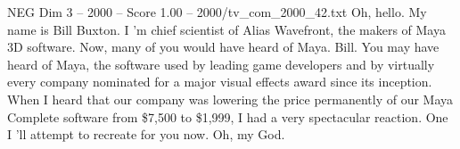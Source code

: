 \begin{textsample}{NEG Dim 3 – 2000 – Score 1.00 – 2000/tv\_com\_2000\_42.txt}  \label{ex:f3_neg_006}
Oh, hello.
My name is Bill Buxton.
I 'm chief scientist of Alias Wavefront, the makers of Maya 3D software.
Now, many of you would have heard of Maya.
Bill.
You may have heard of Maya, the software used by leading game developers and by virtually every company nominated for a major visual effects award since its inception.
When I heard that our company was lowering the price permanently of our Maya Complete software from \$7,500 to \$1,999, I had a very spectacular reaction.
One I 'll attempt to recreate for you now.
Oh, my God.

\end{textsample}
